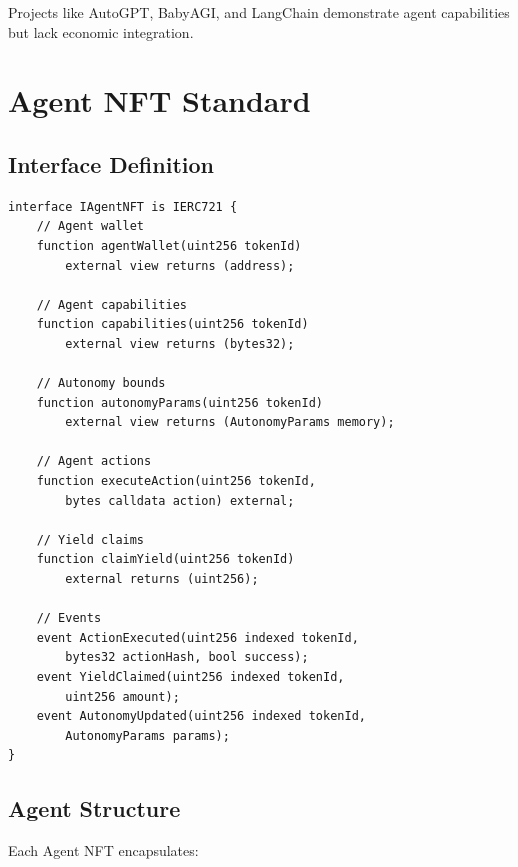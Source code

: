 \documentclass[11pt,letterpaper]{article}
\begin{document}
Projects like AutoGPT, BabyAGI, and LangChain demonstrate agent capabilities but lack economic integration.

\section{Agent NFT Standard}
\label{sec:standard}

\subsection{Interface Definition}

\begin{lstlisting}[language=Solidity,caption=IAgentNFT Interface]
interface IAgentNFT is IERC721 {
    // Agent wallet
    function agentWallet(uint256 tokenId)
        external view returns (address);

    // Agent capabilities
    function capabilities(uint256 tokenId)
        external view returns (bytes32);

    // Autonomy bounds
    function autonomyParams(uint256 tokenId)
        external view returns (AutonomyParams memory);

    // Agent actions
    function executeAction(uint256 tokenId,
        bytes calldata action) external;

    // Yield claims
    function claimYield(uint256 tokenId)
        external returns (uint256);

    // Events
    event ActionExecuted(uint256 indexed tokenId,
        bytes32 actionHash, bool success);
    event YieldClaimed(uint256 indexed tokenId,
        uint256 amount);
    event AutonomyUpdated(uint256 indexed tokenId,
        AutonomyParams params);
}
\end{lstlisting}

\subsection{Agent Structure}

Each Agent NFT encapsulates:
\end{document}
